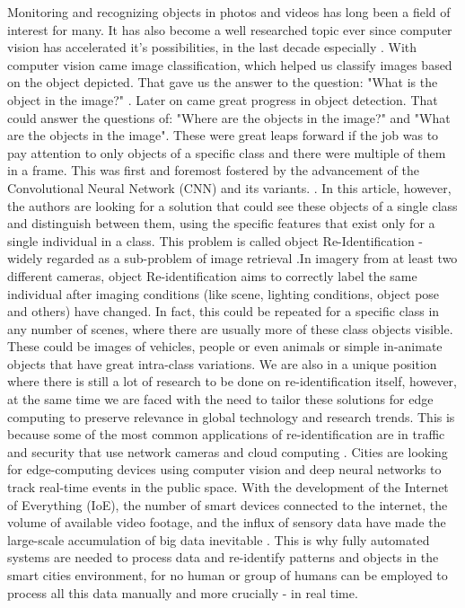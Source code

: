 \documentclass[conference]{IEEEtran} %
\begin{document}
Monitoring and recognizing objects in photos and videos has long been a field of interest for many. It has also become a well researched topic ever since computer vision has accelerated it's possibilities, in the last decade especially  \cite{prince2012computer}.
 With computer vision came image classification, which helped us classify images based on the object depicted. That gave us the answer to the question: "What is the object in the image?" \cite{lu2007survey}.
  Later on came great progress in object detection. That could answer the questions of: "Where are the objects in the image?" and "What are the objects in the image". These were great leaps forward if the job was to pay attention to only objects of a specific class and there were multiple of them in a frame. This was first and foremost fostered by the advancement of the Convolutional Neural Network (CNN) and its variants. \cite{du2018understanding}.
 In this article, however, the authors are looking for a solution that could see these objects of a single class and distinguish between them, using the specific features that exist only for a single individual in a class.
 This problem is called object Re-Identification - widely regarded as a sub-problem of image retrieval \cite{li2019object}.In imagery from at least two different cameras, object Re-identification aims to correctly label the same individual after imaging conditions (like scene, lighting conditions, object pose and others) have changed. In fact, this could be repeated for a specific class in any number of scenes, where there are usually more of these class objects visible. These could be images of vehicles, people or even animals or simple in-animate objects that have great intra-class variations.
 We are also in a unique position where there is still a lot of research to be done on re-identification itself, however, at the same time we are faced with the need to tailor these solutions for edge computing to preserve relevance in global technology and research trends. This is because some of the most common applications of re-identification are in traffic and security that use network cameras and cloud computing \cite{barthelemy2019edge} \cite{wang2024efficient}.
 Cities are looking for edge-computing devices using computer vision and deep neural networks to track real-time events in the public space. With the development of the Internet of Everything (IoE), the number of smart devices connected to the internet, the volume of available video footage, and the influx of sensory data have made the large-scale accumulation of big data inevitable \cite{cao2020overview}. This is why fully automated systems are needed to process data and re-identify patterns and objects in the smart cities environment, for no human or group of humans can be employed to process all this data manually and more crucially - in real time.
\end{document}
